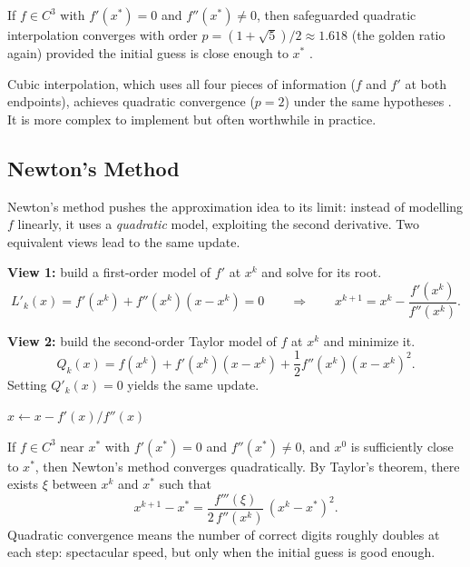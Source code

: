 \begin{theorem}\label{thm:secant-conv}
	If $f \in C^3$ with $f'(x^*) = 0$ and $f''(x^*) \neq 0$, then safeguarded quadratic interpolation converges with order $p = (1 + \sqrt{5})/2 \approx 1.618$ (the golden ratio again) provided the initial guess is close enough to $x^*$ \cite{sun2006}.
\end{theorem}

Cubic interpolation, which uses all four pieces of information ($f$ and $f'$ at both endpoints), achieves quadratic convergence ($p = 2$) under the same hypotheses \cite{sun2006,nocedal2006}.
It is more complex to implement but often worthwhile in practice.


\subsection{Newton's Method}\label{sec:newton-univariate}

Newton's method pushes the approximation idea to its limit: instead of modelling $f$ linearly, it uses a \emph{quadratic} model, exploiting the second derivative.
Two equivalent views lead to the same update.

\textbf{View 1:} build a first-order model of $f'$ at $x^k$ and solve for its root.
\begin{equation}\label{eq:newton-view1}
	L'_k(x) = f'(x^k) + f''(x^k)(x - x^k) = 0
	\qquad \Longrightarrow \qquad
	x^{k+1} = x^k - \frac{f'(x^k)}{f''(x^k)}.
\end{equation}

\textbf{View 2:} build the second-order Taylor model of $f$ at $x^k$ and minimize it.
\begin{equation}\label{eq:newton-taylor-model}
	Q_k(x) = f(x^k) + f'(x^k)(x - x^k) + \frac{1}{2} f''(x^k)(x - x^k)^2.
\end{equation}
Setting $Q'_k(x) = 0$ yields the same update.

\begin{algorithm}
	\caption{Newton's Method (NM)}
	\begin{algorithmic}[1]
				\State $x \gets x - f'(x) / f''(x)$
			\EndWhile
		\EndProcedure
	\end{algorithmic}
\end{algorithm}

\begin{theorem}\label{thm:newton-conv}
	If $f \in C^3$ near $x^*$ with $f'(x^*) = 0$ and $f''(x^*) \neq 0$, and $x^0$ is sufficiently close to $x^*$, then Newton's method converges quadratically.
	By Taylor's theorem, there exists $\xi$ between $x^k$ and $x^*$ such that
	\begin{equation}\label{eq:newton-error}
		x^{k+1} - x^* = \frac{f'''(\xi)}{2\, f''(x^k)}\, (x^k - x^*)^2.
	\end{equation}
	Quadratic convergence means the number of correct digits roughly doubles at each step: spectacular speed, but only when the initial guess is good enough.
\end{theorem}

